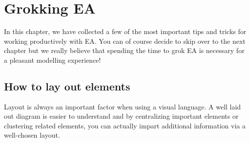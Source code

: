 \chapter{Grokking EA}
\label{chap:Tips and Tricks}

In this chapter, we have collected a few of the most important tips and tricks for working productively with EA.
You can of course decide to skip over to the next chapter but we really believe that spending the time to grok EA is necessary for a pleasant modelling experience!

\section{How to lay out elements}

Layout is always an important factor when using a visual language.
A well laid out diagram is easier to understand and by centralizing important elements or clustering related elements, you can actually impart additional information via a well-chosen layout.

